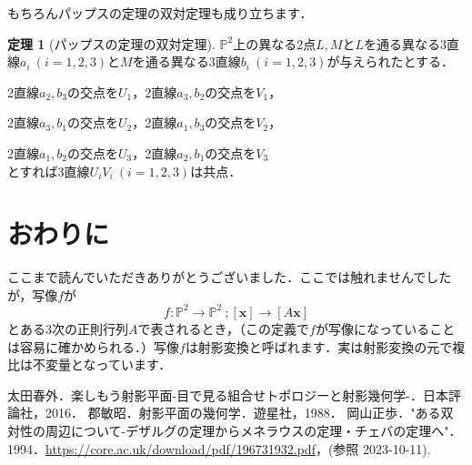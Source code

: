 \documentclass{jsarticle}
\theoremstyle{definition}
\newtheorem{theorem}{定理}
\numberwithin{theorem}{section}
\numberwithin{equation}{section}
\begin{document}
もちろんパップスの定理の双対定理も成り立ちます．
\begin{theorem}[パップスの定理の双対定理]
    $\mathbb{P}^2$上の異なる2点$L,M$と$L$を通る異なる3直線$a_i\ (i=1,2,3)$と$M$を通る異なる3直線$b_i\ (i=1,2,3)$が与えられたとする．
    \par2直線$a_2,b_3$の交点を$U_1$，2直線$a_3,b_2$の交点を$V_1$，
    \par2直線$a_3,b_1$の交点を$U_2$，2直線$a_1,b_3$の交点を$V_2$，
    \par2直線$a_1,b_2$の交点を$U_3$，2直線$a_2,b_1$の交点を$V_3$
    \\とすれば3直線$U_iV_i\ (i=1,2,3)$は共点．
\end{theorem}
\section{おわりに}
ここまで読んでいただきありがとうございました．ここでは触れませんでしたが，写像$f$が
$$f:\mathbb{P}^2\rightarrow\mathbb{P}^2\ ;[\bm{x}]\rightarrow[A\bm{x}]$$
とある3次の正則行列$A$で表されるとき，（この定義で$f$が写像になっていることは容易に確かめられる．）写像$f$は射影変換と呼ばれます．実は射影変換の元で複比は不変量となっています．
\begin{thebibliography}{3}
太田春外．楽しもう射影平面-目で見る組合せトポロジーと射影幾何学-．日本評論社，2016．
郡敏昭．射影平面の幾何学．遊星社，1988．
岡山正歩．"ある双対性の周辺について-デザルグの定理からメネラウスの定理・チェバの定理へ"．1994．\url{https://core.ac.uk/download/pdf/196731932.pdf}，(参照 2023-10-11).
\end{thebibliography}
\end{document}
